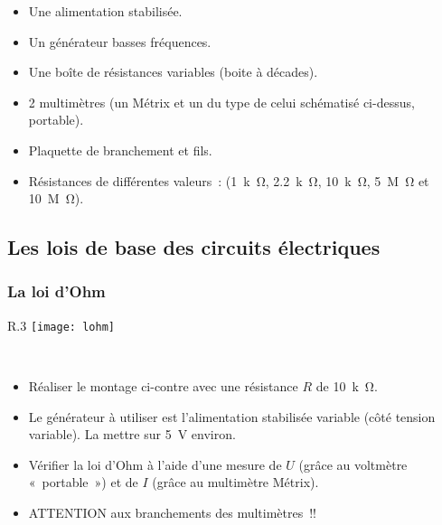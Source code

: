 \documentclass[a4paper, 11pt, final, garamond]{book}
\begin{document}
\begin{minipage}{0.49\linewidth}
    \begin{itemize}
        \item Une alimentation stabilisée.
        \item Un générateur basses fréquences.
        \item Une boîte de résistances variables (boite à décades).
        \item 2 multimètres (un Métrix et un du type de celui schématisé
            ci-dessus, portable).
        \item Plaquette de branchement et fils.
    \end{itemize}
\end{minipage}
\hfill
\begin{minipage}{0.49\linewidth}
    \begin{itemize}
        \item Résistances de différentes valeurs : (\SI{1}{k\ohm},
            \SI{2.2}{k\ohm}, \SI{10}{k\ohm}, \SI{5}{M\ohm} et \SI{10}{M\ohm}).
    \end{itemize}
\end{minipage}

\subsection{Les lois de base des circuits électriques}
\subsubsection{La loi d'Ohm}
\begin{wrapfigure}[5]{R}{.3\linewidth}
    \centering
    \texttt{[image: lohm]}
\end{wrapfigure}
~\vspace{-20pt}
\begin{itemize}
    \item Réaliser le montage ci-contre avec une résistance $R$ de
        \SI{10}{k\ohm}.
    \item Le générateur à utiliser est l’alimentation stabilisée variable (côté
        tension variable). La mettre sur \SI{5}{V} environ.
    \item Vérifier la loi d’Ohm à l’aide d’une mesure de $U$ (grâce au voltmètre
        «~portable~») et de $I$ (grâce au multimètre Métrix).
    \item ATTENTION aux branchements des multimètres !! 
\end{itemize}
\end{document}
